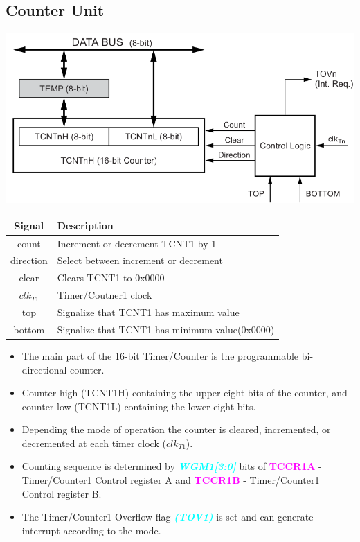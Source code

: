 \documentclass{article}
\newcommand{\bitFormat}[1]{\emph{\textbf{\textcolor{cyan}{#1}}}}
\newcommand{\regFormat}[1]{\textbf{\textcolor{magenta}{#1}}}
\begin{document}
\subsection{Counter Unit}
\begin{minipage}{0.5\textwidth}
    \includegraphics[width=1\textwidth]{Timer1CounterUnit.png}
\end{minipage}
\begin{minipage}{0.45\textwidth}
    \begin{tabular}{c|p{5.5cm}}
        \textbf{Signal} & \textbf{Description}\\
        \hline  
        count & Increment or decrement TCNT1 by 1\\
        direction & Select between increment or decrement\\
        clear & Clears TCNT1 to 0x0000\\
        $clk_{T1}$ & Timer/Coutner1 clock\\
        top & Signalize that TCNT1 has maximum value\\
        bottom & Signalize that TCNT1 has minimum value(0x0000)\\
    \end{tabular}
\end{minipage}
\begin{itemize}
    \item The main part of the 16-bit Timer/Counter is the programmable bi-directional counter.
    \item Counter high (TCNT1H) containing the upper eight bits of the counter, and counter low (TCNT1L) containing the lower eight bits.
    \item Depending the mode of operation the counter is cleared, incremented, or decremented at each timer clock ($clk_{T1}$).
    \item Counting sequence is determined by \bitFormat{WGM1[3:0]} bits of \regFormat{TCCR1A} -Timer/Counter1 Control register A and \regFormat{TCCR1B} - Timer/Counter1 Control register B.
    \item The Timer/Counter1 Overflow flag \bitFormat{(TOV1)} is set and can generate interrupt according to the mode.
\end{itemize}
\end{document}
